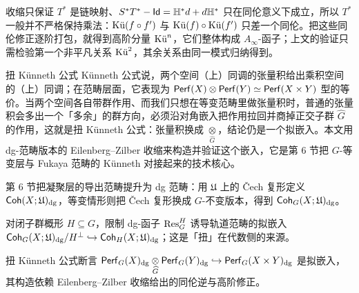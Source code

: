 \begin{yizhu}
收缩只保证 $T^{\ast}$ 是链映射、$S^{\ast}T^{\ast}-\id=\mathbb{H}^{\ast}d+d\mathbb{H}^{\ast}$ 只在同伦意义下成立，所以 $T^{\ast}$ 一般并不严格保持乘法：$\Ku(f\circ f')$ 与 $\Ku(f)\circ\Ku(f')$ 只差一个同伦。把这些同伦修正逐阶打包，就得到高阶分量 $\Ku^n$，它们整体构成 $A_{\infty}$-函子；上文的验证只需检验第一个非平凡关系 $\Ku^2$，其余关系由同一模式归纳得到。
\end{yizhu}

\begin{conceptbox}{扭 Künneth 公式}
Künneth 公式说，两个空间（上）同调的张量积给出乘积空间的（上）同调；在范畴层面，它表现为 $\Perf(X)\otimes\Perf(Y)\simeq\Perf(X\times Y)$ 型的等价。当两个空间各自带群作用、而我们只想在等变范畴里做张量积时，普通的张量积会多出一个「多余」的群方向，必须沿对角嵌入把作用拉回并商掉正交子群 $\widehat{G}$ 的作用，这就是扭 Künneth 公式：张量积换成 $\underset{\widehat{G}}{\otimes}$，结论仍是一个拟嵌入。本文用 dg-范畴版本的 Eilenberg–Zilber 收缩来构造并验证这个嵌入，它是第 6 节把 $G$-等变层与 Fukaya 范畴的 Künneth 对接起来的技术核心。
\par\smallskip{}
\end{conceptbox}

\begin{keytakeaways}
\item 第 6 节把凝聚层的导出范畴提升为 dg 范畴：用 $\mathfrak{U}$ 上的 Čech 复形定义 $\Coh(X;\mathfrak{U})_{\dg}$，等变情形则把 Čech 复形换成 $G$-不变版本，得到 $\Coh_G(X;\mathfrak{U})_{\dg}$。
\item 对闭子群概形 $H\subseteq G$，限制 dg-函子 $\Res_G^H$ 诱导轨道范畴的拟嵌入 $\Coh_G(X;\mathfrak{U})_{\dg}/H^\perp\hookrightarrow\Coh_H(X;\mathfrak{U})_{\dg}$；这是「扭」在代数侧的来源。
\item 扭 Künneth 公式断言 $\Perf_G(X)_{\dg}\underset{\widehat{G}}{\otimes}\Perf_G(Y)_{\dg}\hookrightarrow\Perf_G(X\times Y)_{\dg}$ 是拟嵌入，其构造依赖 Eilenberg–Zilber 收缩给出的同伦逆与高阶修正。
\end{keytakeaways}
